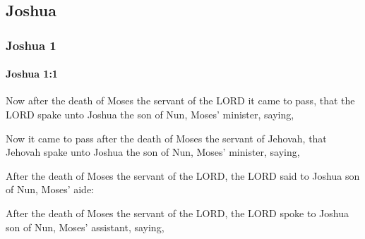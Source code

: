 \subsection{Joshua}
	\label{JOSHUA}

	\subsubsection{Joshua 1} %
		\label{JOSHUA-1}

		\paragraph{Joshua 1:1} %
			\label{JOSHUA-1-1}

			Now after the death of Moses the servant of the LORD it came to pass, that the LORD spake unto Joshua the son of Nun, Moses’ minister, saying,

			\begin{versebox}
					\item[BHS] 
					\item[ASV] Now it came to pass after the death of Moses the servant of Jehovah, that Jehovah spake unto Joshua the son of Nun, Moses' minister, saying,
					\item[NIV] After the death of Moses the servant of the LORD, the LORD said to Joshua son of Nun, Moses’ aide:
					\item[NRSV] After the death of Moses the servant of the LORD, the LORD spoke to Joshua son of Nun, Moses’ assistant, saying,
			\end{versebox}

